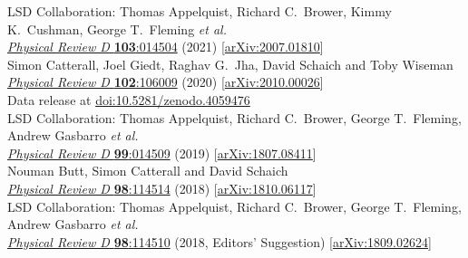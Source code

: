 \begin{spacelist}
\begin{revnumerate}
      LSD Collaboration: Thomas Appelquist, Richard C.~Brower, Kimmy K.~Cushman, George T.~Fleming \textit{et al.} \\ %
      \href{https://doi.org/10.1103/PhysRevD.103.014504}{\textit{Physical Review D} \textbf{103}:014504} (2021) [\href{http://arxiv.org/abs/2007.01810}{arXiv:2007.01810}]
    \pagebreakitem
       \\
      Simon Catterall, Joel Giedt, Raghav G.~Jha, David Schaich and Toby Wiseman \\
      \href{https://doi.org/10.1103/PhysRevD.102.106009}{\textit{Physical Review D} \textbf{102}:106009} (2020) [\href{http://arxiv.org/abs/2010.00026}{arXiv:2010.00026}] \\
      Data release at \href{https://doi.org/10.5281/zenodo.4059476}{doi:10.5281/zenodo.4059476}
    \pagebreakitem
       \\
      LSD Collaboration: Thomas Appelquist, Richard C.~Brower, George T.~Fleming, Andrew Gasbarro \textit{et al.} \\ %
      \href{https://doi.org/10.1103/PhysRevD.99.014509}{\textit{Physical Review D} \textbf{99}:014509} (2019) [\href{http://arxiv.org/abs/1807.08411}{arXiv:1807.08411}]
    \pagebreakitem
       \\
      Nouman Butt, Simon Catterall and David Schaich \\
      \href{https://doi.org/10.1103/PhysRevD.98.114514}{\textit{Physical Review D} \textbf{98}:114514} (2018) [\href{http://arxiv.org/abs/1810.06117}{arXiv:1810.06117}]
    \pagebreakitem
       \\
      LSD Collaboration: Thomas Appelquist, Richard C.~Brower, George T.~Fleming, Andrew Gasbarro \textit{et al.} \\ %
      \href{https://doi.org/10.1103/PhysRevD.98.114510}{\textit{Physical Review D} \textbf{98}:114510} (2018, Editors' Suggestion) [\href{http://arxiv.org/abs/1809.02624}{arXiv:1809.02624}]

\end{revnumerate}
\end{spacelist}

